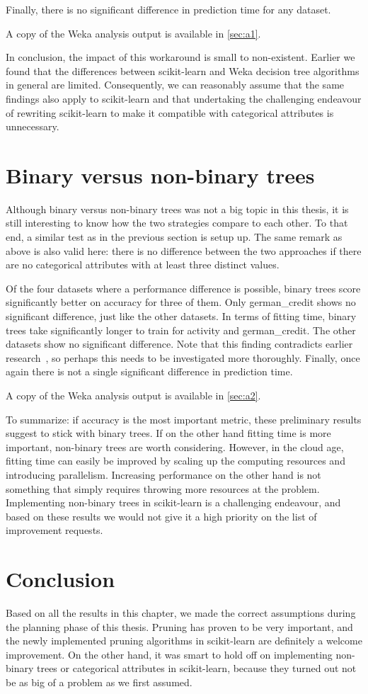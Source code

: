 Finally, there is no significant difference in prediction time for any dataset.

A copy of the Weka analysis output is available in \autoref{sec:a1}.

In conclusion, the impact of this workaround is small to non-existent. Earlier we found that the differences between scikit-learn and Weka decision tree algorithms in general are limited. Consequently, we can reasonably assume that the same findings also apply to scikit-learn and that undertaking the challenging endeavour of rewriting scikit-learn to make it compatible with categorical attributes is unnecessary.

\section{Binary versus non-binary trees}
Although binary versus non-binary trees was not a big topic in this thesis, it is still interesting to know how the two strategies compare to each other. To that end, a similar test as in the previous section is setup up. The same remark as above is also valid here: there is no difference between the two approaches if there are no categorical attributes with at least three distinct values.

Of the four datasets where a performance difference is possible, binary trees score significantly better on accuracy for three of them. Only german\_credit shows no significant difference, just like the other datasets. In terms of fitting time, binary trees take significantly longer to train for activity and german\_credit. The other datasets show no significant difference. Note that this finding contradicts earlier research~\cite{elomaa1999general}, so perhaps this needs to be investigated more thoroughly. Finally, once again there is not a single significant difference in prediction time.

A copy of the Weka analysis output is available in \autoref{sec:a2}.

To summarize: if accuracy is the most important metric, these preliminary results suggest to stick with binary trees. If on the other hand fitting time is more important, non-binary trees are worth considering. However, in the cloud age, fitting time can easily be improved by scaling up the computing resources and introducing parallelism. Increasing performance on the other hand is not something that simply requires throwing more resources at the problem. Implementing non-binary trees in scikit-learn is a challenging endeavour, and based on these results we would not give it a high priority on the list of improvement requests.

\section{Conclusion}
Based on all the results in this chapter, we made the correct assumptions during the planning phase of this thesis. Pruning has proven to be very important, and the newly implemented pruning algorithms in scikit-learn are definitely a welcome improvement. On the other hand, it was smart to hold off on implementing non-binary trees or categorical attributes in scikit-learn, because they turned out not be as big of a problem as we first assumed.